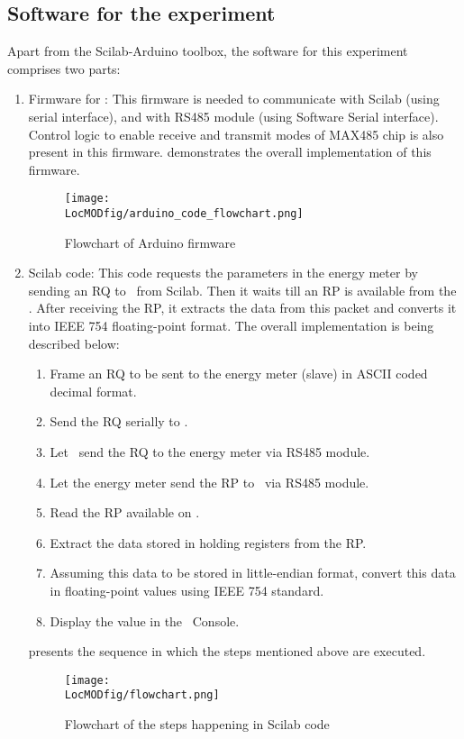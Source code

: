 \subsection{Software for the experiment}
Apart from the Scilab-Arduino toolbox, the software for this experiment comprises two parts:
\begin{enumerate}
\item  Firmware for \arduino: This firmware is needed to communicate
with Scilab (using serial interface), and with RS485 module (using
Software Serial interface). Control logic to enable receive and
transmit modes of MAX485 chip is also present in this firmware.  demonstrates the overall implementation of this firmware.

\begin{figure}
  \centering
  \texttt{[image: \\LocMODfig/arduino\_code\_flowchart.png]}
  \caption{Flowchart of Arduino firmware}
  \label{fig:modbus-firmware}
\end{figure}

\item Scilab code: This code requests the parameters in the energy meter
by sending an RQ to \arduino\ from Scilab. Then it waits till
an RP is available from the \arduino. After receiving the RP, it extracts 
the data from this packet and converts it into IEEE
754 floating-point format. The overall implementation is being
described below:
\begin {enumerate}
\item Frame an RQ to be sent to the energy meter (slave) in ASCII coded decimal
format. 
\item Send the RQ serially to \arduino. 
\item Let \arduino\ send the RQ to the energy meter via RS485 module. 
\item Let the energy meter send the RP to \arduino\ via RS485 module. 
\item Read the RP available on \arduino. 
\item Extract the data stored in holding registers from the RP. 
\item Assuming this data to be stored in little-endian format, 
convert this data in floating-point values using IEEE 754 standard. 
\item Display the value in the \scilab\ Console. 
\end{enumerate}
 presents the sequence in which the steps mentioned above are executed. 
\begin{figure}
  \centering
  \texttt{[image: \\LocMODfig/flowchart.png]}
  \caption{Flowchart of the steps happening in Scilab code}
  \label{fig:flow-chart}
\end{figure}

\end{enumerate}

